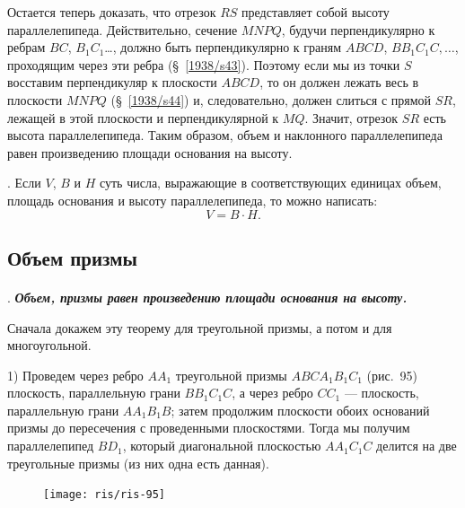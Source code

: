 \documentclass[twoside]{book}
\begin{document}
Остается теперь доказать, что отрезок $RS$ представляет собой высоту параллелепипеда. %
Действительно, сечение $MNPQ$, будучи перпендикулярно к ребрам $BC$, $B_1C_1$\dots, должно быть перпендикулярно к граням $ABCD$, $BB_1C_1C,\dots$, проходящим через эти ребра (§~\ref{1938/s43}).
Поэтому если мы из точки $S$ восставим перпендикуляр к плоскости $ABCD$, то он должен лежать весь в плоскости $MNPQ$ (§~\ref{1938/s44}) и, следовательно, должен слиться с прямой $SR$, лежащей в этой плоскости и перпендикулярной к $MQ$.
Значит, отрезок $SR$ есть высота параллелепипеда.
Таким образом, объем и наклонного параллелепипеда равен произведению площади основания на высоту.

.
Если $V$, $B$ и $H$ суть числа, выражающие в соответствующих единицах объем, площадь основания и высоту параллелепипеда, то можно написать:
\[V = B\cdot H.\]

\subsection*{Объем призмы}

\paragraph{}\label{1938/s88}
.
\textbf{\emph{Объем, призмы равен произведению площади основания на высоту.}}

Сначала докажем эту теорему для треугольной призмы, а потом и для многоугольной.

1) Проведем через ребро $AA_1$ треугольной призмы $ABCA_1B_1C_1$ (рис.~95) плоскость, параллельную грани $BB_1C_1C$, а через ребро $CC_1$ --- плоскость, параллельную грани $AA_1B_1B$;
затем продолжим плоскости обоих оснований призмы до пересечения с проведенными плоскостями.
Тогда мы получим параллелепипед $BD_1$, который диагональной плоскостью $AA_1C_1C$ делится на две треугольные призмы (из них одна есть данная).

\begin{figure}[h!]
\centering
\texttt{[image: ris/ris-95]}
\caption{}
\end{figure}
\end{document}
